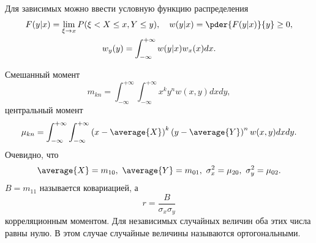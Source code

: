 Для зависимых можно ввести условную функцию распределения
\begin{gather*}
    F(y|x) = \lim_{\xi \to x} P(\xi < X \le x, Y \le y),\quad
    w(y|x) = \pder{F(y|x)}{y} \ge 0,\\
    w_y(y) = \int_{-\infty}^{+\infty} w(y|x) w_x(x) dx.
\end{gather*}

Смешанный момент
\[
    m_{kn} = \int_{-\infty}^{+\infty}\int_{-\infty}^{+\infty}x^ky^nw(x,y)dxdy,
\]
центральный момент
\[
    \mu_{kn} = \int_{-\infty}^{+\infty}\int_{-\infty}^{+\infty}
        \left(x-\average{X}\right)^k
        \left(y-\average{Y}\right)^n w(x,y)dxdy.
\]
Очевидно, что
\[
    \average{X} = m_{10},\ \average{Y} = m_{01},\ \sigma_x^2 = \mu_{20},
    \ \sigma_y^2 = \mu_{02}.
\]
\( B = m_{11} \) называется ковариацией, а
\[
    r = \frac{B}{\sigma_x\sigma_y}
\]
корреляционным моментом. Для независимых случайных величин оба этих числа равны
нулю. В этом случае случайные величины называются ортогональными.

